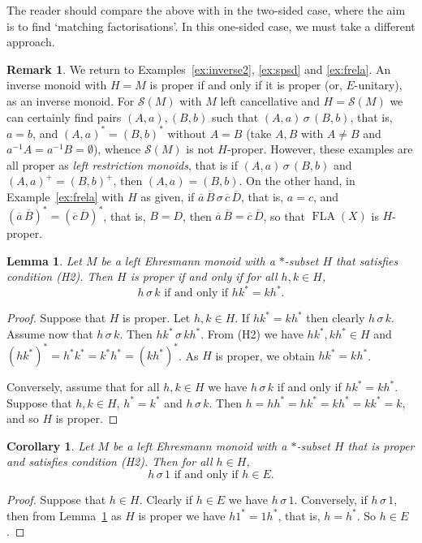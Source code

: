 \documentclass[12pt]{amsart}
\newtheorem{lem}[them]{Lemma}
\newtheorem{cor}[them]{Corollary}
\theoremstyle{definition}
\newtheorem{rem}[them]{Remark}
\theoremstyle{definition}
\numberwithin{them}{section}
\numberwithin{equation}{section}
\DeclareMathOperator{\FLA}{FLA}
\begin{document}
The reader should compare the above with \cite[Definition 3.4]{KL} in the two-sided case, where the aim is to find `matching factorisations'. In this one-sided case, we must take a different approach.


\begin{rem} \label{ex:proper} We return to Examples~\ref{ex:inverse2}, \ref{ex:spsd} and \ref{ex:frela}. An inverse monoid with $H=M$ is proper if and only if it is proper (or, $E$-unitary), as an inverse monoid. For $\mathcal{S}(M)$ with $M$ left cancellative and $H=\mathcal{S}(M)$ we can certainly find pairs $(A,a),(B,b)$ such that  
$(A,a)\,\sigma\, (B,b)$, that is, $a=b$, and
$(A,a)^*=(B,b)^*$ without $A=B$ (take $A,B$ with $A\neq B$ and $a^{-1}A=a^{-1}B=\emptyset$), whence $\mathcal{S}(M)$ is not $H$-proper. However, these examples are all proper as {\em left restriction monoids}, that is if $(A,a)\,\sigma\, (B,b)$ and $(A,a)^+=(B,b)^+$, then $(A,a)=(B,b)$.  On the other hand,
in Example~\ref{ex:frela} with $H$ as given, if  
$\overline{a}\, \overline{B}\,\sigma\,\overline{c}\, \overline{D}$, that is, $a=c$, and $(\overline{a}\, \overline{B})^*=(\overline{c}\, \overline{D})^*$, that is, $B=D$, then $\overline{a}\, \overline{B}=\overline{c}\, \overline{D}$, so that $\FLA(X)$ is $H$-proper.
\end{rem}


\begin{lem}\label{lem:proper}   Let $M$ be  a left Ehresmann monoid with a $*$-subset $H$ that satisfies condition (H2).
Then $H$ is proper if and only if for all $h,k\in H$, 
\[h\,\sigma\, k\mbox{ if and only if }hk^*=kh^*.\] 
\end{lem}

\begin{proof}  Suppose that $H$ is proper. Let $h,k\in H$. If $hk^*=kh^*$ then clearly $h\,\sigma\, k$.
Assume now that $h\,\sigma\, k$. Then $hk^*\,\sigma\, kh^*$. From (H2)  we have $hk^*,kh^*\in H$ and
$(hk^*)^*=h^*k^*=k^*h^*=(kh^*)^*$. As $H$  is proper,  we obtain $hk^*=kh^*$. 

Conversely, assume  that for all $h,k\in H$ we have
$h\,\sigma\, k$ if and only if $hk^*=kh^*$. Suppose that $h,k\in H$, $h^*=k^*$ and $h\,\sigma\, k$. 
Then $h=hh^*=hk^*=kh^*=kk^*=k$, and so $H$ is proper. 
    \end{proof}


\begin{cor}\label{cor:hSigma1_M}   Let $M$ be  a left Ehresmann monoid with a $*$-subset $H$ that  is proper and   satisfies condition (H2).
Then for all $h \in H$,  \[h\, \sigma\, 1\mbox{ if and only if }h \in E.\]
\end{cor}
\begin{proof}
Suppose that $h \in H$. Clearly if $h \in E$ we have  $h\, \sigma\, 1$. Conversely, if $h\, \sigma\, 1$, then from Lemma~\ref{lem:proper} as $H$ is proper we have $h1^* = 1h^*$, that is, $h =h^*$. So $h \in E$.
\end{proof}
\end{document}
